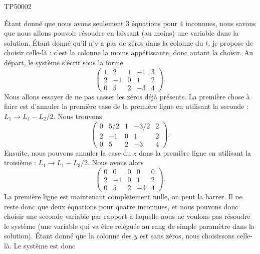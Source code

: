 \begin{corrige}{TP50002}

	Étant donné que nous avons seulement $3$ équations pour $4$ inconnues, nous savons que nous allons pouvoir résoudre en laissant (au moins) une variable dans la solution. Étant donné qu'il n'y a pas de zéros dans la colonne du $t$, je propose de choisir celle-là : c'est la colonne la moins appétissante, donc autant la choisir.
	Au départ, le système s'écrit sous la forme
	\begin{equation}
		\left(
		\begin{array}{cccc|c}
			1	&	2	&	1	&	-1	&	3	\\
			2	&	-1	&	0	&	1	&	2	\\
			0	&	5	&	2	&	-3	&	4
		\end{array}
		\right).
	\end{equation}
	Nous allons essayer de ne pas casser les zéros déjà présents. La première chose à faire est d'annuler la première case de la première ligne en utilisant la seconde : $L_1\to L_1-L_2/2$. Nous trouvons
	\begin{equation}
		\left(
		\begin{array}{cccc|c}
			0	&	5/2	&	1	&	-3/2	&	2	\\
			2	&	-1	&	0	&	1	&	2	\\
			0	&	5	&	2	&	-3	&	4
		\end{array}
		\right).
	\end{equation}
	Ensuite, nous pouvons annuler la case du $z$ dans la première ligne en utilisant la troisième : $L_1\to L_1-L_3/2$. Nous avons alors
	\begin{equation}
		\left(
		\begin{array}{cccc|c}
			0	&	0	&	0	&	0	&	0	\\
			2	&	-1	&	0	&	1	&	2	\\
			0	&	5	&	2	&	-3	&	4
		\end{array}
		\right).
	\end{equation}
	La première ligne est maintenant complètement nulle, on peut la barrer. Il ne reste donc que deux équations pour quatre inconnues, et nous pouvons donc choisir une seconde variable par rapport à laquelle nous ne voulons pas résoudre le système (une variable qui va être reléguée au rang de simple paramètre dans la solution). Étant donné que la colonne des $y$ est sans zéros, nous choisissons celle-là. Le système est donc

\end{corrige}
